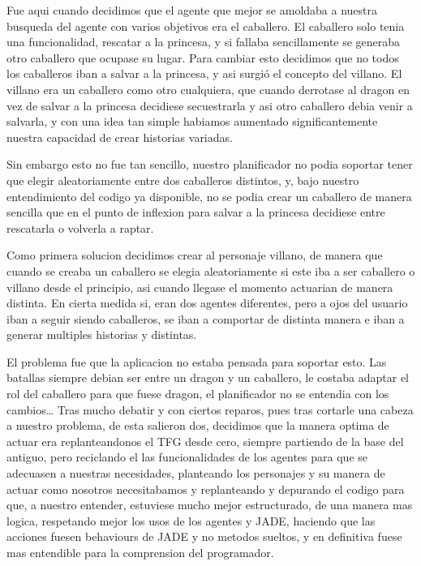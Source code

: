 Fue aqui cuando decidimos que el agente que mejor se amoldaba a nuestra busqueda del agente con varios objetivos era el caballero.
El caballero solo tenia una funcionalidad, rescatar a la princesa, y si fallaba sencillamente se generaba otro caballero que ocupase su lugar.
Para cambiar esto decidimos que no todos los caballeros iban a salvar a la princesa, y asi surgi\'o el concepto del villano. El villano era un caballero como otro cualquiera, que cuando derrotase al dragon en vez de salvar a la princesa decidiese secuestrarla y asi otro caballero debia venir a salvarla, y con una idea tan simple habiamos aumentado significantemente nuestra capacidad de crear historias variadas.

Sin embargo esto no fue tan sencillo, nuestro planificador no podia soportar tener que elegir aleatoriamente entre dos caballeros distintos, y, bajo nuestro entendimiento del codigo ya disponible, no se podia crear un caballero de manera sencilla que en el punto de inflexion para salvar a la princesa decidiese entre rescatarla o volverla a raptar.

Como primera solucion decidimos crear al personaje villano, de manera que cuando se creaba un caballero se elegia aleatoriamente si este iba a ser caballero o villano desde el principio, asi cuando llegase el momento actuarian de manera distinta. En cierta medida si, eran dos agentes diferentes, pero a ojos del usuario iban a seguir siendo caballeros, se iban a comportar de distinta manera e iban a generar multiples historias y distintas.

El problema fue que la aplicacion no estaba pensada para soportar esto. Las batallas siempre debian ser entre un dragon y un caballero, le costaba adaptar el rol del caballero para que fuese dragon, el planificador no se entendia con los cambios… Tras mucho debatir y con ciertos reparos, pues tras cortarle una cabeza a nuestro problema, de esta salieron dos, decidimos que la manera optima de actuar era replanteandonos el TFG desde cero, siempre partiendo de la base del antiguo, pero reciclando el las funcionalidades de los agentes para que se adecuasen a nuestras necesidades, planteando los personajes y su manera de actuar como nosotros necesitabamos y replanteando y depurando el codigo para que, a nuestro entender, estuviese mucho mejor estructurado, de una manera mas logica, respetando mejor los usos de los agentes y JADE, haciendo que las acciones fuesen behaviours de JADE y no metodos sueltos, y en definitiva fuese mas entendible para la comprension del programador.

